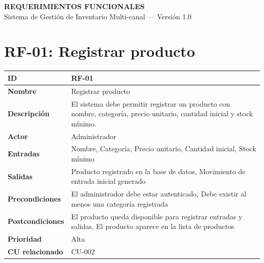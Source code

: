 \documentclass{article}
\begin{document}
\begin{center}
{\Large \textbf{REQUERIMIENTOS FUNCIONALES}}\\[4pt]
Sistema de Gestión de Inventario Multi-canal --- Versión 1.0
\end{center}

\section*{RF-01: Registrar producto}
\begin{center}
\renewcommand{\arraystretch}{1.4}
\begin{tabular}{|L{4cm}|L{12cm}|}
\hline
\textbf{ID} & RF-01 \\
\hline
\textbf{Nombre} & Registrar producto \\
\hline
\textbf{Descripción} & El sistema debe permitir registrar un producto con nombre, categoría, precio unitario, cantidad inicial y stock mínimo. \\
\hline
\textbf{Actor} & Administrador \\
\hline
\textbf{Entradas} & Nombre, Categoría, Precio unitario, Cantidad inicial, Stock mínimo \\
\hline
\textbf{Salidas} & Producto registrado en la base de datos, Movimiento de entrada inicial generado \\
\hline
\textbf{Precondiciones} & El administrador debe estar autenticado, Debe existir al menos una categoría registrada \\
\hline
\textbf{Postcondiciones} & El producto queda disponible para registrar entradas y salidas, El producto aparece en la lista de productos \\
\hline
\textbf{Prioridad} & Alta \\
\hline
\textbf{CU relacionado} & CU-002 \\
\hline
\end{tabular}
\end{center}
\end{document}
